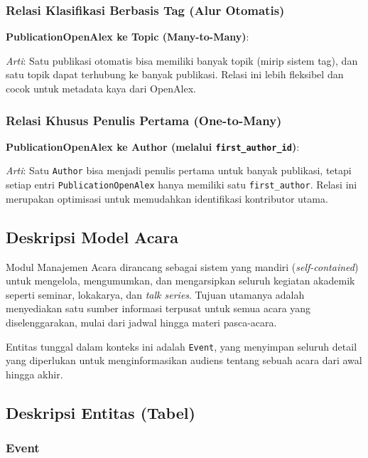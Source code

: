 \subsubsection*{Relasi Klasifikasi Berbasis Tag (Alur Otomatis)}
\textbf{PublicationOpenAlex ke Topic (Many-to-Many)}:

\textit{Arti}: Satu publikasi otomatis bisa memiliki banyak topik (mirip sistem tag), dan satu topik dapat 
terhubung ke banyak publikasi. Relasi ini lebih fleksibel dan cocok untuk metadata kaya dari OpenAlex.

\subsubsection*{Relasi Khusus Penulis Pertama (One-to-Many)}
\textbf{PublicationOpenAlex ke Author (melalui \texttt{first\_author\_id})}:

\textit{Arti}:  
Satu \texttt{Author} bisa menjadi penulis pertama untuk banyak publikasi,  
tetapi setiap entri \texttt{PublicationOpenAlex} hanya memiliki satu \texttt{first\_author}.  
Relasi ini merupakan optimisasi untuk memudahkan identifikasi kontributor utama.

\subsection{Deskripsi Model Acara}
Modul Manajemen Acara dirancang sebagai sistem yang mandiri (\textit{self-contained}) 
untuk mengelola, mengumumkan, dan mengarsipkan seluruh kegiatan akademik seperti seminar, 
lokakarya, dan \textit{talk series}. Tujuan utamanya adalah menyediakan satu sumber 
informasi terpusat untuk semua acara yang diselenggarakan, mulai dari jadwal hingga 
materi pasca-acara.

Entitas tunggal dalam konteks ini adalah \texttt{Event}, yang menyimpan seluruh detail 
yang diperlukan untuk menginformasikan audiens tentang sebuah acara dari awal hingga akhir.


\subsection{Deskripsi Entitas (Tabel)}

\subsubsection{Event}

